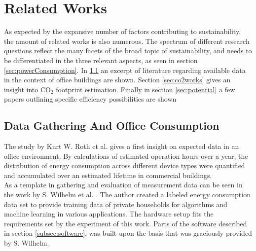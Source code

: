 \chapter{Related Works}\label{chap:relatedworks}
As expected by the expansive number of factors contributing to sustainability, the amount of related works is also numerous. The spectrum of different research questions reflect the many facets of the broad topic of sustainability, and needs to be differentiated in the three relevant aspects, as seen in section \ref{sec:powerConsumption}. In \ref{sec:officedata} an excerpt of literature regarding available data in the context of office buildings are shown. Section \ref{sec:co2works} gives an insight into CO$_2$ footprint estimation. Finally in section \ref{sec:potential} a few papers outlining specific efficiency possibilities are shown
\section{Data Gathering And Office Consumption}\label{sec:officedata}
The study by Kurt W. Roth et al. \cite{roth} gives a first insight on expected data in an office environment. By calculations of estimated operation hours over a year, the distribution of energy consumption across different device types were quantified and accumulated over an estimated lifetime in commercial buildings.\\
As a template in gathering and evaluation of measurement data can be seen in the work by S. Wilhelm et al. \cite{wilhelm}. The author created a labeled energy consumption data set to provide training data of private households for algorithms and machine learning in various applications. The hardware setup fits the requirements set by the experiment of this work. Parts of the software described in section \ref{subsec:software}, was built upon the basis that was graciously provided by S. Wilhelm.

